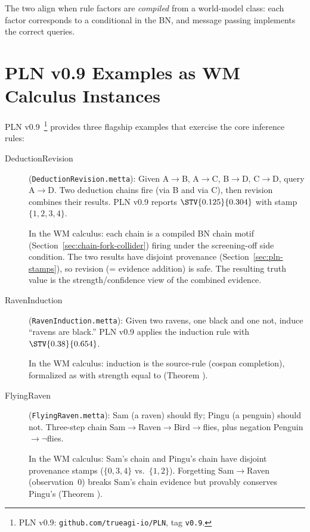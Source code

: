 \documentclass[11pt,openany]{report}
\begin{document}
The two align when rule factors are \emph{compiled} from a world-model
class: each factor corresponds to a conditional in the BN, and message
passing implements the correct queries.

\section{PLN v0.9 Examples as WM Calculus Instances}
\label{sec:pln-v09-examples}

PLN v0.9~\cite{goertzel2009pln}\footnote{PLN v0.9: \texttt{github.com/trueagi-io/PLN}, tag \texttt{v0.9}.}
provides three flagship examples that exercise the core inference rules:

\begin{description}
\item[DeductionRevision] (\texttt{DeductionRevision.metta}):
  Given A$\to$B, A$\to$C, B$\to$D, C$\to$D, query A$\to$D.
  Two deduction chains fire (via B and via C), then revision
  combines their results.  PLN v0.9 reports
  $\STV{0.125}{0.304}$ with stamp $\{1,2,3,4\}$.

  In the WM calculus: each chain is a compiled BN chain motif
  (Section~\ref{sec:chain-fork-collider}) firing under the
  screening-off side condition.  The two results have disjoint
  provenance (Section~\ref{sec:pln-stamps}), so revision
  (= evidence addition) is safe.  The resulting truth value
  is the strength/confidence view of the combined evidence.

\item[RavenInduction] (\texttt{RavenInduction.metta}):
  Given two ravens, one black and one not, induce ``ravens are black.''
  PLN v0.9 applies the induction rule with $\STV{0.38}{0.654}$.

  In the WM calculus: induction is the source-rule (cospan completion),
  formalized as  with strength equal to
  (Theorem ).

\item[FlyingRaven] (\texttt{FlyingRaven.metta}):
  Sam (a raven) should fly; Pingu (a penguin) should not.
  Three-step chain Sam$\to$Raven$\to$Bird$\to$flies, plus
  negation Penguin$\to\lnot$flies.

  In the WM calculus: Sam's chain and Pingu's chain have
  disjoint provenance stamps ($\{0,3,4\}$ vs.\ $\{1,2\}$).
  Forgetting Sam$\to$Raven (observation~0) breaks Sam's
  chain evidence but provably conserves Pingu's
  (Theorem ).
\end{description}
\end{document}
